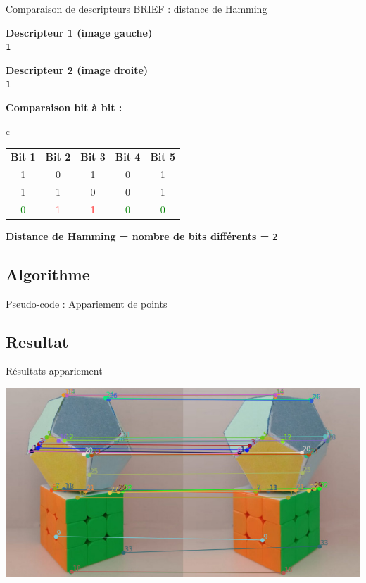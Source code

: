 \begin{frame}{Comparaison de descripteurs BRIEF : distance de Hamming}
\centering
\small
{}

\textbf{Descripteur 1 (image gauche)}\\[0.2em]
\texttt{1    }
\pause

\vspace{0.8em}
\textbf{Descripteur 2 (image droite)}\\[0.2em]
\texttt{1    }
\pause

\vspace{1em}
\textbf{Comparaison bit à bit :}\\[0.5em]
\begin{tabular}{c}
\begin{tabular}{c c c c c}
\textbf{Bit 1} & \textbf{Bit 2} & \textbf{Bit 3} & \textbf{Bit 4} & \textbf{Bit 5} \\
1 & 0 & 1 & 0 & 1 \\
1 & 1 & 0 & 0 & 1 \\
\hline
\textcolor{green}{0} & \textcolor{red}{1} & \textcolor{red}{1} & \textcolor{green}{0} & \textcolor{green}{0}
\end{tabular}
\end{tabular}
\pause

\vspace{1em}
\textbf{Distance de Hamming = nombre de bits différents = } \texttt{2}

\end{frame}


\subsection{Algorithme}

\begin{frame}[fragile]{Pseudo-code : Appariement de points}
  
\end{frame}

\subsection{Resultat}

\begin{frame}{Résultats appariement}
\begin{center}
\includegraphics[width=\linewidth]{capture/app_complet_2.jpeg}\\
\hyperlink{brief-appendix}{
}
\hyperlink{sift-appendix}{
}
\end{center}

\end{frame}
